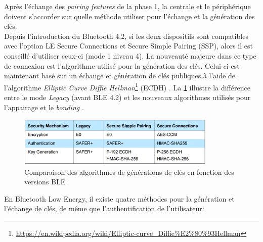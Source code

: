 
Après l'échange des \textit{pairing features} de la phase 1, la centrale et le périphérique doivent s'accorder sur quelle méthode utiliser pour l'échange et la génération des clés. \\



Depuis l'introduction du Bluetooth 4.2, si les deux dispositifs sont compatibles avec l'option LE Secure Connections et Secure Simple Pairing (SSP), alors il est conseillé d'utiliser ceux-ci (mode 1 niveau 4). La nouveauté majeure dans ce type de connexion est l'algorithme utilisé pour la génération des clés. Celui-ci est maintenant basé sur un échange et génération de clés publiques à l'aide de l'algorithme \textit{Elliptic Curve Diffie Hellman}\footnote{\url{https://en.wikipedia.org/wiki/Elliptic-curve_Diffie\%E2\%80\%93Hellman}} (ECDH) \cite{ble_basic_intro:online}. La \cref{fig-algorithms_4_2} illustre la différence entre le mode \textit{Legacy} (avant BLE 4.2) et les nouveaux algorithmes utilisés pour l'appairage et le \textit{bonding} \cite{Differen40:online}. \\


\begin{figure}[ht!]
    \centering
    \includegraphics[width=0.85\textwidth]{Figures/Security/BLE/algorithms_4_2.PNG}
    \caption{Comparaison des algorithmes de générations de clés en fonction des versions BLE}
    \label{fig-algorithms_4_2}
\end{figure}



En Bluetooth Low Energy, il existe quatre méthodes pour la génération et l'échange de clés, de même que l'authentification de l'utilisateur: 

